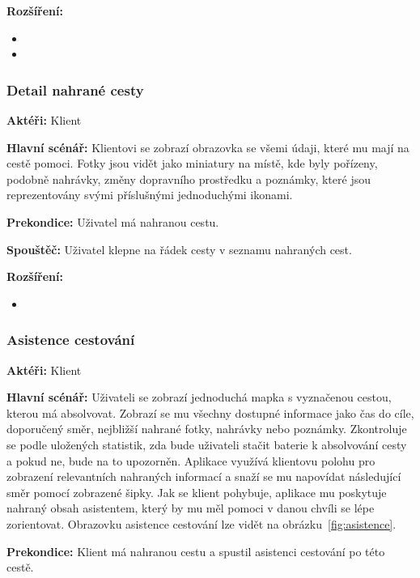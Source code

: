 \documentclass{article}
\newcommand{\usecase}[2]{\subsubsection{#1}\label{#2}}
\begin{document}
\vspace{0.1cm}
\noindent
\textbf{Rozšíření:}
\begin{itemize}
  \item {}
  \item {}
\end{itemize}

\usecase{Detail nahrané cesty}{detailklient}
\textbf{Aktéři:} Klient

\vspace{0.1cm}
\noindent
\textbf{Hlavní scénář:} Klientovi se zobrazí obrazovka se všemi údaji, které mu mají na cestě pomoci.
Fotky jsou vidět jako miniatury na místě, kde byly pořízeny, podobně nahrávky, změny dopravního prostředku
a poznámky, které jsou reprezentovány svými příslušnými jednoduchými ikonami.

\vspace{0.1cm}
\noindent
\textbf{Prekondice:} Uživatel má nahranou cestu.

\vspace{0.1cm}
\noindent
\textbf{Spouštěč:} Uživatel klepne na řádek cesty v seznamu nahraných cest.

\vspace{0.1cm}
\noindent
\textbf{Rozšíření:}
\begin{itemize}
  \item {}
\end{itemize}


\usecase{Asistence cestování}{asistence}
\textbf{Aktéři:} Klient

\vspace{0.1cm}
\noindent
\textbf{Hlavní scénář:} Uživateli se zobrazí jednoduchá mapka s vyznačenou cestou, kterou má absolvovat.
Zobrazí se mu všechny dostupné informace jako čas do cíle, doporučený směr, nejbližší nahrané fotky,
nahrávky nebo poznámky. Zkontroluje se podle uložených statistik, zda bude uživateli stačit baterie
k absolvování cesty a pokud ne, bude na to upozorněn.
Aplikace využívá klientovu polohu pro zobrazení relevantních nahraných informací
a snaží se mu napovídat následující směr pomocí zobrazené šipky. Jak se klient pohybuje, aplikace mu
poskytuje nahraný obsah asistentem, který by mu měl pomoci v danou chvíli se lépe zorientovat.
Obrazovku asistence cestování lze vidět na obrázku~\ref{fig:asistence}.

\vspace{0.1cm}
\noindent
\textbf{Prekondice:} Klient má nahranou cestu a spustil asistenci cestování po této cestě.
\end{document}
